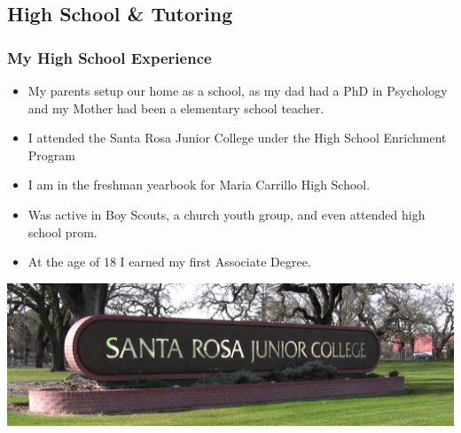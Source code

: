 \documentclass{beamer}
\begin{document}
		\subsection{High School \& Tutoring}
			\begin{frame}
				\frametitle{My High School Experience}
				\begin{itemize}
\item My parents setup our home as a school, as my dad had a PhD in Psychology and my Mother had been a elementary school teacher.  
\item I attended the Santa Rosa Junior College under the High School Enrichment Program
\item I am in the freshman yearbook for Maria Carrillo High School.  
\item Was active in Boy Scouts, a church youth group, and even attended high school prom. 
\item At the age of 18 I earned my first Associate Degree.  
				\end{itemize}
				\begin{center}
					\includegraphics[width = 1.0\textwidth]{images/SRJC_sign.png}
				\end{center}
			\end{frame}
		
\end{document}
